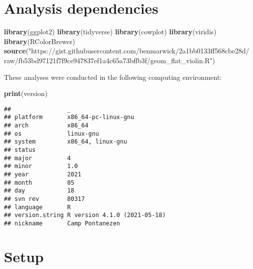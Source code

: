 \documentclass[]{book}
\newenvironment{Shaded}{\begin{snugshade}}{\end{snugshade}}
\newcommand{\KeywordTok}[1]{\textcolor[rgb]{0.13,0.29,0.53}{\textbf{#1}}}
\newcommand{\NormalTok}[1]{#1}
\newcommand{\StringTok}[1]{\textcolor[rgb]{0.31,0.60,0.02}{#1}}
\begin{document}
\hypertarget{analysis-dependencies}{%
\section{Analysis dependencies}\label{analysis-dependencies}}

\begin{Shaded}
\begin{Highlighting}[]
\KeywordTok{library}\NormalTok{(ggplot2)}
\KeywordTok{library}\NormalTok{(tidyverse)}
\KeywordTok{library}\NormalTok{(cowplot)}
\KeywordTok{library}\NormalTok{(viridis)}
\KeywordTok{library}\NormalTok{(RColorBrewer)}
\KeywordTok{source}\NormalTok{(}\StringTok{"https://gist.githubusercontent.com/benmarwick/2a1bb0133ff568cbe28d/raw/fb53bd97121f7f9ce947837ef1a4c65a73bffb3f/geom_flat_violin.R"}\NormalTok{)}
\end{Highlighting}
\end{Shaded}

These analyses were conducted in the following computing environment:

\begin{Shaded}
\begin{Highlighting}[]
\KeywordTok{print}\NormalTok{(version)}
\end{Highlighting}
\end{Shaded}

\begin{verbatim}
##                _                           
## platform       x86_64-pc-linux-gnu         
## arch           x86_64                      
## os             linux-gnu                   
## system         x86_64, linux-gnu           
## status                                     
## major          4                           
## minor          1.0                         
## year           2021                        
## month          05                          
## day            18                          
## svn rev        80317                       
## language       R                           
## version.string R version 4.1.0 (2021-05-18)
## nickname       Camp Pontanezen
\end{verbatim}

\hypertarget{setup}{%
\section{Setup}\label{setup}}
\end{document}
